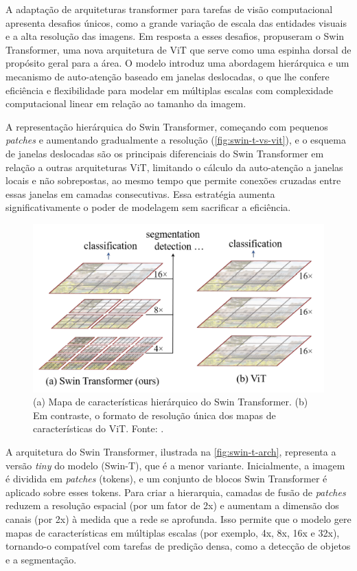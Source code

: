 A adaptação de arquiteturas transformer para tarefas de visão computacional apresenta desafios únicos, como a grande variação de escala das entidades visuais e a alta resolução das imagens. Em resposta a esses desafios,  propuseram o Swin Transformer, uma nova arquitetura de ViT que serve como uma espinha dorsal de propósito geral para a área. O modelo introduz uma abordagem hierárquica e um mecanismo de auto-atenção baseado em janelas deslocadas, o que lhe confere eficiência e flexibilidade para modelar em múltiplas escalas com complexidade computacional linear em relação ao tamanho da imagem.

A representação hierárquica do Swin Transformer, começando com pequenos \textit{patches} e aumentando gradualmente a resolução (\autoref{fig:swin-t-vs-vit}), e o esquema de janelas deslocadas são os principais diferenciais do Swin Transformer em relação a outras arquiteturas ViT, limitando o cálculo da auto-atenção a janelas locais e não sobrepostas, ao mesmo tempo que permite conexões cruzadas entre essas janelas em camadas consecutivas. Essa estratégia aumenta significativamente o poder de modelagem sem sacrificar a eficiência.

\begin{figure}[!htbp]
    \centering
    \includegraphics[width=0.7\linewidth]{figs/swin_t_vs_vit.png}
    \caption{(a) Mapa de características hierárquico do Swin Transformer. (b) Em contraste, o formato de resolução única dos mapas de características do ViT. Fonte: .}
    \label{fig:swin-t-vs-vit}
\end{figure}

A arquitetura do Swin Transformer, ilustrada na \autoref{fig:swin-t-arch}, representa a versão \textit{tiny} do modelo (Swin-T), que é a menor variante. Inicialmente, a imagem é dividida em \textit{patches} (tokens), e um conjunto de blocos Swin Transformer é aplicado sobre esses tokens. Para criar a hierarquia, camadas de fusão de \textit{patches} reduzem a resolução espacial (por um fator de 2x) e aumentam a dimensão dos canais (por 2x) à medida que a rede se aprofunda. Isso permite que o modelo gere mapas de características em múltiplas escalas (por exemplo, 4x, 8x, 16x e 32x), tornando-o compatível com tarefas de predição densa, como a detecção de objetos e a segmentação.

